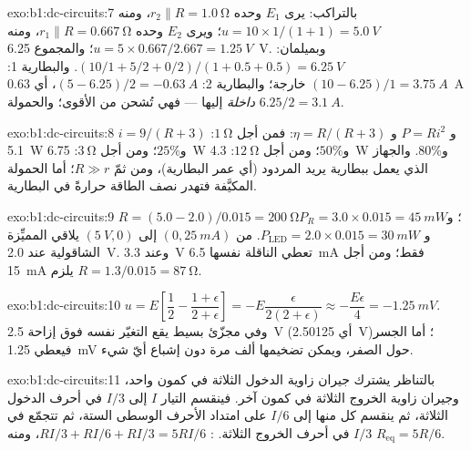 \begin{solution}{exo:b1:dc-circuits:7}
بالتراكب: يرى $E_1$ وحده $r_2 \parallel R = \qty{1.0}{\ohm}$، ومنه
$u = 10 \times 1/(1 + 1) = \qty{5.0}{V}$؛ ويرى $E_2$ وحده $r_1 \parallel R
= \qty{0.667}{\ohm}$، ومنه $u = 5 \times 0.667/2.667 = \qty{1.25}{V}$؛ والمجموع
\qty{6.25}{V}. وبميلمان: $(10/1 + 5/2 + 0/2)/(1 + 0.5 + 0.5) = \qty{6.25}{V}$.
والبطارية 1: $(10 - 6.25)/1 = \qty{3.75}{A}$ خارجة؛ والبطارية 2: $(5 - 6.25)/2
= \qty{-0.63}{A}$، أي \qty{0.63}{A} \emph{داخلة} إليها --- فهي تُشحن
من الأقوى؛ والحمولة $6.25/2 = \qty{3.1}{A}$.
\end{solution}

\begin{solution}{exo:b1:dc-circuits:8}
$i = 9/(R + 3)$ و $P = Ri^2$ و $\eta = R/(R + 3)$: فمن أجل $\qty{1}{\ohm}$:
\qty{5.1}{W} و$25\%$؛ ومن أجل $\qty{3}{\ohm}$: \qty{6.75}{W} و$50\%$؛
ومن أجل $\qty{12}{\ohm}$: \qty{4.3}{W} و$80\%$. والجهاز الذي يعمل ببطارية يريد
المردود (أي عمر البطارية)، ومن ثمّ $R \gg r$؛ أما الحمولة المكيَّفة فتهدر نصف
الطاقة حرارةً في البطارية.
\end{solution}

\begin{solution}{exo:b1:dc-circuits:9}
$R = (5.0 - 2.0)/0.015 = \qty{200}{\ohm}$؛ و$P_R = 3.0 \times 0.015 =
\qty{45}{mW}$ و $P_{\mathrm{LED}} = 2.0 \times 0.015 = \qty{30}{mW}$.  من $(0, \qty{25}{mA})$ إلى $(\qty{5}{V}, 0)$ يلاقي المميِّزة
الشاقولية عند \qty{2.0}{V}. وعند \qty{3.3}{V} تعطي الناقلة نفسها
\qty{6.5}{mA} فقط؛ ومن أجل \qty{15}{mA} يلزم $R = 1.3/0.015 =
\qty{87}{\ohm}$.
\end{solution}

\begin{solution}{exo:b1:dc-circuits:10}
$u = E\left[\dfrac12 - \dfrac{1 + \epsilon}{2 + \epsilon}\right] =
-E\dfrac{\epsilon}{2(2 + \epsilon)} \approx -\dfrac{E\epsilon}{4} =
\qty{-1.25}{mV}$. وفي مجزّئ بسيط يقع التغيّر نفسه فوق إزاحة
\qty{2.5}{V} (أي \qty{2.50125}{V})؛ أما الجسر فيعطي
\qty{1.25}{mV} حول الصفر، ويمكن تضخيمها ألف مرة
دون إشباع أيّ شيء.
\end{solution}

\begin{solution}{exo:b1:dc-circuits:11}
بالتناظر يشترك جيران زاوية الدخول الثلاثة في كمون
واحد، وجيران زاوية الخروج الثلاثة في كمون آخر. فينقسم التيار
$I$ إلى $I/3$ في أحرف الدخول الثلاثة، ثم ينقسم كل منها إلى
$I/6$ على امتداد الأحرف الوسطى الستة، ثم تتجمّع في $I/3$ في
أحرف الخروج الثلاثة. : $RI/3 + RI/6 + RI/3 = 5RI/6$، ومنه
$R_{\mathrm{eq}} = 5R/6$.
\end{solution}

